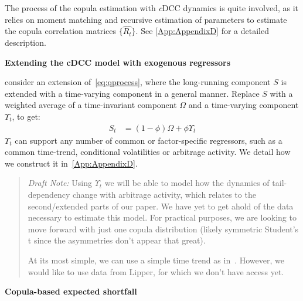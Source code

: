 The process of the copula estimation with \textit{c}DCC dynamics is quite involved, as it relies on moment matching and recursive estimation of parameters to estimate the copula correlation matrices $\{\hat{R_t}\}$. See \autoref{App:AppendixD} for a detailed description.

\textbf{Extending the cDCC model with exogenous regressors}

\Textcite{ChristoffersenErrunzaJacobLanglois2012} consider an extension of~\eqref{eq:qprocess}, where the long-running component $S$ is extended with a time-varying component in a general manner. Replace $S$ with a weighted average of a time-invariant component $\Omega$ and a time-varying component $\Upsilon_t$, to get:
\begin{align}
    S_t &= (1 - \phi) \Omega + \phi \Upsilon_t
\end{align}
$\Upsilon_t$ can support any number of common or factor-specific regressors, such as a common time-trend, conditional volatilities or arbitrage activity. We detail how we construct it in~\autoref{App:AppendixD}.

\begin{quote}
    \textit{Draft Note:} Using $\Upsilon_t$ we will be able to model how the dynamics of tail-dependency change with arbitrage activity, which relates to the second/extended parts of our paper. We have yet to get ahold of the data necessary to estimate this model. For practical purposes, we are looking to move forward with just one copula distribution (likely symmetric Student's t since the asymmetries don't appear that great).

    At its most simple, we can use a simple time trend as in~\autocite{ChristoffersenErrunzaJacobLanglois2012}. However, we would like to use data from Lipper, for which we don't have access yet.
\end{quote}

\textbf{Copula-based expected shortfall}

